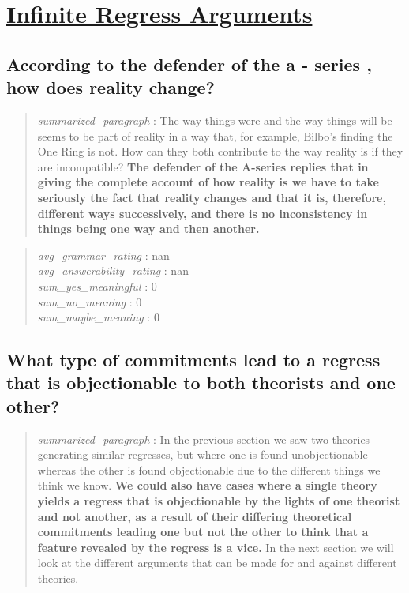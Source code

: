\hypertarget{infinite-regress-arguments}{%
\section{\texorpdfstring{\href{https://plato.stanford.edu/entries/infinite-regress/index.html}{Infinite
Regress
Arguments}}{Infinite Regress Arguments}}\label{infinite-regress-arguments}}

\hypertarget{according-to-the-defender-of-the-a---series-how-does-reality-change}{%
\subsection{According to the defender of the a - series , how does
reality
change?}\label{according-to-the-defender-of-the-a---series-how-does-reality-change}}

\begin{quote}
\emph{summarized\_paragraph} : The way things were and the way things
will be seems to be part of reality in a way that, for example, Bilbo's
finding the One Ring is not. How can they both contribute to the way
reality is if they are incompatible? \textbf{The defender of the
A-series replies that in giving the complete account of how reality is
we have to take seriously the fact that reality changes and that it is,
therefore, different ways successively, and there is no inconsistency in
things being one way and then another.}
\end{quote}

\begin{quote}
\emph{avg\_grammar\_rating} : nan\\
\emph{avg\_answerability\_rating} : nan\\
\emph{sum\_yes\_meaningful} : 0\\
\emph{sum\_no\_meaning} : 0\\
\emph{sum\_maybe\_meaning} : 0
\end{quote}

\hypertarget{what-type-of-commitments-lead-to-a-regress-that-is-objectionable-to-both-theorists-and-one-other}{%
\subsection{What type of commitments lead to a regress that is
objectionable to both theorists and one
other?}\label{what-type-of-commitments-lead-to-a-regress-that-is-objectionable-to-both-theorists-and-one-other}}

\begin{quote}
\emph{summarized\_paragraph} : In the previous section we saw two
theories generating similar regresses, but where one is found
unobjectionable whereas the other is found objectionable due to the
different things we think we know. \textbf{We could also have cases
where a single theory yields a regress that is objectionable by the
lights of one theorist and not another, as a result of their differing
theoretical commitments leading one but not the other to think that a
feature revealed by the regress is a vice.} In the next section we will
look at the different arguments that can be made for and against
different theories.
\end{quote}

